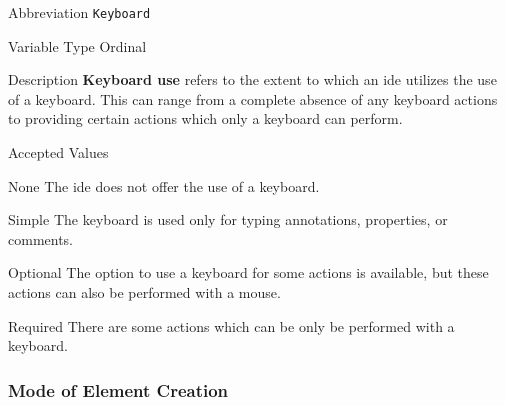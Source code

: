 \begin{AlignedDesc}
  \item[Abbreviation] \texttt{Keyboard}

  \item[Variable Type] Ordinal

  \item[Description] \textbf{Keyboard use} refers to the extent to which an
  \ac{ide} utilizes the use of a keyboard.  This can range from a complete
  absence of any keyboard actions to providing certain actions which only a
  keyboard can perform.

  \item[Accepted Values]

  \begin{AlignedDesc}
    \item[None] The \ac{ide} does not offer the use of a keyboard.
    \item[Simple] The keyboard is used only for typing annotations,
      properties, or comments.
    \item[Optional] The option to use a keyboard for some actions is
    available, but these actions can also be performed with a mouse.
    \item[Required] There are some actions which can be only be performed
    with a keyboard.
  \end{AlignedDesc}

\end{AlignedDesc}

\subsubsection{Mode of Element Creation}
\label{subsubsec:mode}

